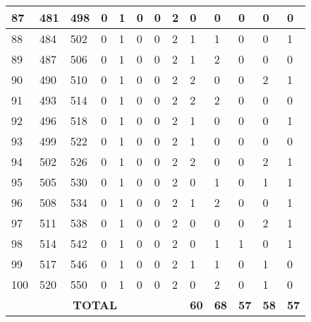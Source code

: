 \begin{sidewaystable}[!h]
\begin{tabular}{|l|l|l|l|l|l|l|l|l|l|l|l|l|}
		87 & 481 & 498 & 0 & 1 & 0 & 0 & 2 & 0 & 0 & 0 & 0 & 0 \\ \hline
		88 & 484 & 502 & 0 & 1 & 0 & 0 & 2 & 1 & 1 & 0 & 0 & 1 \\ \hline
		89 & 487 & 506 & 0 & 1 & 0 & 0 & 2 & 1 & 2 & 0 & 0 & 0 \\ \hline
		90 & 490 & 510 & 0 & 1 & 0 & 0 & 2 & 2 & 0 & 0 & 2 & 1 \\ \hline
		91 & 493 & 514 & 0 & 1 & 0 & 0 & 2 & 2 & 2 & 0 & 0 & 0 \\ \hline
		92 & 496 & 518 & 0 & 1 & 0 & 0 & 2 & 1 & 0 & 0 & 0 & 1 \\ \hline
		93 & 499 & 522 & 0 & 1 & 0 & 0 & 2 & 1 & 0 & 0 & 0 & 0 \\ \hline
		94 & 502 & 526 & 0 & 1 & 0 & 0 & 2 & 2 & 0 & 0 & 2 & 1 \\ \hline
		95 & 505 & 530 & 0 & 1 & 0 & 0 & 2 & 0 & 1 & 0 & 1 & 1 \\ \hline
		96 & 508 & 534 & 0 & 1 & 0 & 0 & 2 & 1 & 2 & 0 & 0 & 1 \\ \hline
		97 & 511 & 538 & 0 & 1 & 0 & 0 & 2 & 0 & 0 & 0 & 2 & 1 \\ \hline
		98 & 514 & 542 & 0 & 1 & 0 & 0 & 2 & 0 & 1 & 1 & 0 & 1 \\ \hline
		99 & 517 & 546 & 0 & 1 & 0 & 0 & 2 & 1 & 1 & 0 & 1 & 0 \\ \hline
		100 & 520 & 550 & 0 & 1 & 0 & 0 & 2 & 0 & 2 & 0 & 1 & 0 \\ \hline
		\multicolumn{8}{|c|}{\textbf{TOTAL}} & \textbf{60} & \textbf{68} & \textbf{57} & \textbf{58} & \textbf{57} \\ \hline
	\end{tabular}
\end{sidewaystable}
\clearpage

